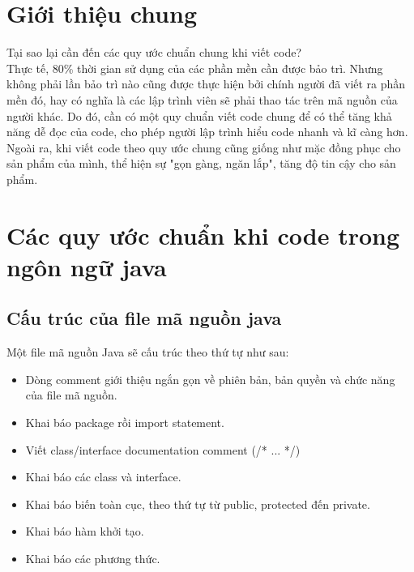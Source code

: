 \documentclass[a4paper]{report}
\author{Truong Quang Khanh}
\begin{document}
 
	\chapter{Giới thiệu chung}
	Tại sao lại cần đến các quy ước chuẩn chung khi viết code? \\
    Thực tế, 80\% thời gian sử dụng của các phần mền cần được bảo trì. Nhưng không phải lần 		bảo trì nào cũng được thực hiện bởi chính người đã viết ra phần mền đó, hay có nghĩa là 	các lập trình viên sẽ phải thao tác trên mã nguồn của người khác. Do đó, cần có một quy 	chuẩn viết code chung để có thể tăng khả năng dễ đọc của code, cho phép người lập trình 	hiểu code nhanh và kĩ càng hơn. Ngoài ra, khi viết code theo quy ước chung cũng giống 			như mặc đồng phục cho sản phẩm của mình, thể hiện sự "gọn gàng, ngăn lắp", tăng độ tin 		cậy cho sản phẩm.
	\chapter{Các quy ước chuẩn khi code trong ngôn ngữ java}
	\section{Cấu trúc của file mã nguồn java}
    Một file mã nguồn Java sẽ cấu trúc theo thứ tự như sau:
    \begin{itemize}
        \item Dòng comment giới thiệu ngắn gọn về phiên bản, bản quyền và chức năng của 				file mã nguồn.
        \item Khai báo package rồi import statement.
        \item Viết class/interface documentation comment (/* ... */)
        \item Khai báo các class và interface.
        \item Khai báo biến toàn cục, theo thứ tự từ public, protected đến private.
        \item Khai báo hàm khởi tạo.
        \item Khai báo các phương thức.
    \end{itemize}
\end{document}

